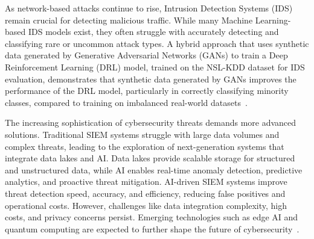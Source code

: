 As network-based attacks continue to rise, Intrusion Detection Systems (IDS) remain crucial for detecting malicious traffic. While many Machine Learning-based IDS models exist, they often struggle with accurately detecting and classifying rare or uncommon attack types. A hybrid approach that uses synthetic data generated by Generative Adversarial Networks (GANs) to train a Deep Reinforcement Learning (DRL) model, trained on the NSL-KDD dataset for IDS evaluation, demonstrates that synthetic data generated by GANs improves the performance of the DRL model, particularly in correctly classifying minority classes, compared to training on imbalanced real-world datasets~\cite{strickland2023drlgan}.

The increasing sophistication of cybersecurity threats demands more advanced solutions. Traditional SIEM systems struggle with large data volumes and complex threats, leading to the exploration of next-generation systems that integrate data lakes and AI. Data lakes provide scalable storage for structured and unstructured data, while AI enables real-time anomaly detection, predictive analytics, and proactive threat mitigation. AI-driven SIEM systems improve threat detection speed, accuracy, and efficiency, reducing false positives and operational costs. However, challenges like data integration complexity, high costs, and privacy concerns persist. Emerging technologies such as edge AI and quantum computing are expected to further shape the future of cybersecurity~\cite{ethan2025nextgensiem}.
